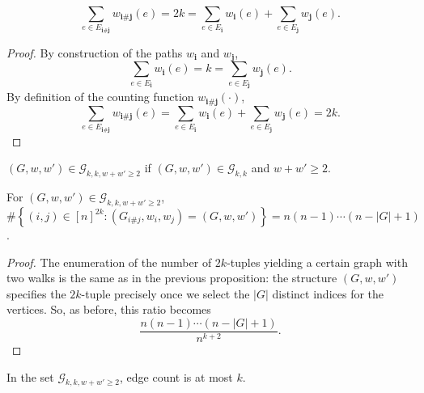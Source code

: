 \begin{lemma}
  \notready
  \label{lem:sum_count_edge_pair_eq_length_add_length}
  \[
  \sum_{e \in E_{\mathbf{i} \# \mathbf{j}}} w_{\mathbf{i} \# \mathbf{j}}(e)
  = 2k
  = \sum_{e \in E_\mathbf{i}} w_{\mathbf{i}}(e) + \sum_{e \in E_\mathbf{j}} w_{\mathbf{j}}(e).
  \]
\end{lemma}

\begin{proof}
  By construction of the paths $w_\mathbf{i}$ and $w_\mathbf{j}$,
  \[
  \sum_{e \in E_\mathbf{i}} w_{\mathbf{i}}(e) = k = \sum_{e \in E_\mathbf{j}} w_{\mathbf{j}}(e).
  \]
  By definition of the counting function $w_{\mathbf{i} \# \mathbf{j}}(\cdot)$,
  \[
  \sum_{e \in E_{\mathbf{i} \# \mathbf{j}}} w_{\mathbf{i} \# \mathbf{j}}(e)
  = \sum_{e \in E_\mathbf{i}} w_{\mathbf{i}}(e) + \sum_{e \in E_\mathbf{j}} w_{\mathbf{j}}(e)
  = 2k.
  \]
\end{proof}


\begin{definition}
  \notready
  \label{def:graph_walk_triple_set_w_ge_two}
  $(G,w,w')\in \mathcal{G}_{k,k,w+w'\ge 2}$ if $(G,w,w') \in \mathcal{G}_{k,k}$ and $w + w' \ge 2$.
\end{definition}


\begin{proposition}
  \label{lem:g_w_w_count}
  \notready
  For $(G, w, w') \in \mathcal{G}_{k,k,w+w'\ge 2}$, $\#\left\{(i,{j})\in [n]^{2k}\colon (G_{i\#j},w_{i},w_{j}) = (G,w,w')\right\} = n(n-1)\cdots (n-|G|+1)$.
\end{proposition}

\begin{proof}
  \notready
  The enumeration of the number of $2k$-tuples yielding a certain graph with two walks is the same
  as in the previous proposition: the structure $(G,w,w')$ specifies the $2k$-tuple precisely once
  we select the $|G|$ distinct indices for the vertices.  So, as before, this ratio becomes \[ \frac{n(n-1)\cdots (n-|G|+1)}{n^{k+2}}. \]
\end{proof}


\begin{lemma}
  \label{lem:g_k_k_edge_count_maximum}
  \notready

  In the set $\mathcal{G}_{k,k,w+w'\ge 2}$, edge count is at most $k$.
\end{lemma}

